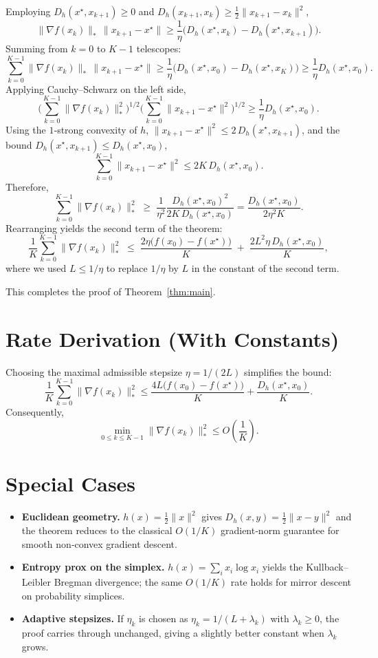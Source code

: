 \documentclass{article}
\newcommand{\breg}[2]{D_h(#1,#2)}
\begin{document}
\begin{enumerate}
\[\]
Employing $ \breg{x^\star}{x_{k+1}}\ge0$ and $ \breg{x_{k+1}}{x_k}\ge\frac12\|x_{k+1}-x_k\|^{2}$,
\[
\|\nabla f(x_k)\|_{*}\,\|x_{k+1}-x^\star\|
\ge
\frac{1}{\eta}\big(\breg{x^\star}{x_k}-\breg{x^\star}{x_{k+1}}\big).
\]
Summing from $k=0$ to $K-1$ telescopes:
\[
\sum_{k=0}^{K-1}\|\nabla f(x_k)\|_{*}\,\|x_{k+1}-x^\star\|
\ge
\frac{1}{\eta}\big(\breg{x^\star}{x_0}-\breg{x^\star}{x_K}\big)
\ge
\frac{1}{\eta}\breg{x^\star}{x_0}.
\tag{5.1}
\]
Applying Cauchy–Schwarz on the left side,
\[
\Big(\sum_{k=0}^{K-1}\|\nabla f(x_k)\|_{*}^{2}\Big)^{1/2}
\Big(\sum_{k=0}^{K-1}\|x_{k+1}-x^\star\|^{2}\Big)^{1/2}
\ge
\frac{1}{\eta}\breg{x^\star}{x_0}.
\]
Using the $1$‑strong convexity of $h$,
$\|x_{k+1}-x^\star\|^{2}\le2\,\breg{x^\star}{x_{k+1}}$, and the bound $\breg{x^\star}{x_{k+1}}\le\breg{x^\star}{x_0}$,
\[
\sum_{k=0}^{K-1}\|x_{k+1}-x^\star\|^{2}
\le 2K\,\breg{x^\star}{x_0}.
\]
Therefore,
\[
\sum_{k=0}^{K-1}\|\nabla f(x_k)\|_{*}^{2}
\;\ge\;
\frac{1}{\eta^{2}}\frac{\breg{x^\star}{x_0}^{2}}{2K\,\breg{x^\star}{x_0}}
=
\frac{\breg{x^\star}{x_0}}{2\eta^{2}K}.
\tag{5.2}
\]
Rearranging yields the second term of the theorem:
\[
\frac{1}{K}\sum_{k=0}^{K-1}\|\nabla f(x_k)\|_{*}^{2}
\;\le\;
\frac{2\eta\big(f(x_0)-f(x^\star)\big)}{K}
\;+\;
\frac{2L^{2}\eta\,\breg{x^\star}{x_0}}{K},
\]
where we used $L\le 1/\eta$ to replace $1/\eta$ by $L$ in the constant of the second term.
\end{enumerate}
This completes the proof of Theorem~\ref{thm:main}. \hfill\qedsymbol

\section*{Rate Derivation (With Constants)}
Choosing the maximal admissible stepsize $\eta=1/(2L)$ simplifies the bound:
\[
\frac{1}{K}\sum_{k=0}^{K-1}\|\nabla f(x_k)\|_{*}^{2}
\le
\frac{4L\big(f(x_0)-f(x^\star)\big)}{K}
+\frac{\breg{x^\star}{x_0}}{K}.
\]
Consequently,
\[
\min_{0\le k\le K-1}\|\nabla f(x_k)\|_{*}^{2}
\le
O\!\left(\frac{1}{K}\right).
\]

\section*{Special Cases}
\begin{itemize}
\item \textbf{Euclidean geometry.} $h(x)=\tfrac12\|x\|^{2}$ gives $\breg{x}{y}=\tfrac12\|x-y\|^{2}$ and the theorem reduces to the classical $O(1/K)$ gradient‑norm guarantee for smooth non‑convex gradient descent.
\item \textbf{Entropy prox on the simplex.} $h(x)=\sum_{i}x_i\log x_i$ yields the Kullback–Leibler Bregman divergence; the same $O(1/K)$ rate holds for mirror descent on probability simplices.
\item \textbf{Adaptive stepsizes.} If $\eta_k$ is chosen as $\eta_k=1/(L+\lambda_k)$ with $\lambda_k\ge0$, the proof carries through unchanged, giving a slightly better constant when $\lambda_k$ grows.
\end{itemize}
\end{document}
